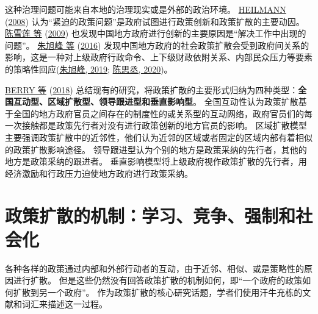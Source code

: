 \documentclass[
  12pt,
]{ctexart}
\begin{document}
这种治理问题可能来自本地的治理现实或是外部的政治环境。
\protect\hyperlink{ref-Heilmann2008}{HEILMANN} (\protect\hyperlink{ref-Heilmann2008}{2008}) 认为``紧迫的政策问题''是政府试图进行政策创新和政策扩散的主要动因。
\protect\hyperlink{ref-ChenXueLianYangXueDong2009}{陈雪莲 等} (\protect\hyperlink{ref-ChenXueLianYangXueDong2009}{2009}) 也发现中国地方政府进行创新的主要原因是``解决工作中出现的问题''。
\protect\hyperlink{ref-ZhuXuFengZhaoHui2016}{朱旭峰 等} (\protect\hyperlink{ref-ZhuXuFengZhaoHui2016}{2016}) 发现中国地方政府的社会政策扩散会受到政府间关系的影响，这是一种对上级政府行政命令、上下级财政依附关系、内部民众压力等要素的策略性回应(\protect\hyperlink{ref-ZhuXuFeng2019}{朱旭峰, 2019}; \protect\hyperlink{ref-ChenSiCheng2020}{陈思丞, 2020})。

\protect\hyperlink{ref-BerryBerry2018}{BERRY 等} (\protect\hyperlink{ref-BerryBerry2018}{2018}) 总结现有的研究，将政策扩散的主要形式归纳为四种类型：\textbf{全国互动型、区域扩散型、领导跟进型和垂直影响型}。
全国互动性认为政策扩散基于全国的地方政府官员之间存在的制度性的或关系型的互动网络，政府官员们的每一次接触都是政策先行者对没有进行政策创新的地方官员的影响。
区域扩散模型主要强调政策扩散中的近邻性，他们认为近邻的区域或者固定的区域内部有着相似的政策扩散影响途径。
领导跟进型认为个别的地方是政策采纳的先行者，其他的地方是政策采纳的跟进者。
垂直影响模型将上级政府视作政策扩散的先行者，用经济激励和行政压力迫使地方政府进行政策采纳。

\newpage

\hypertarget{ux653fux7b56ux6269ux6563ux7684ux673aux5236ux5b66ux4e60ux7adeux4e89ux5f3aux5236ux548cux793eux4f1aux5316}{%
\section{政策扩散的机制：学习、竞争、强制和社会化}\label{ux653fux7b56ux6269ux6563ux7684ux673aux5236ux5b66ux4e60ux7adeux4e89ux5f3aux5236ux548cux793eux4f1aux5316}}

各种各样的政策通过内部和外部行动者的互动，由于近邻、相似、或是策略性的原因进行扩散。
但是这些仍然没有回答政策扩散的机制如何，即``一个政府的政策如何扩散到另一个政府''。
作为政策扩散的核心研究话题，学者们使用汗牛充栋的文献和词汇来描述这一过程。
\end{document}
